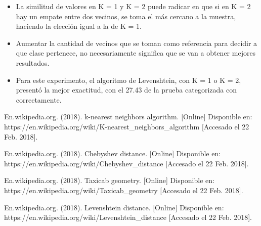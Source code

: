 \documentclass[conference]{IEEEtran}
\begin{document}
\begin{itemize}
\item La similitud de valores en K = 1 y K = 2 puede radicar en que si en K = 2 hay un empate entre dos vecinos, se toma el más cercano a la muestra, haciendo la elección igual a la de K = 1.
\item Aumentar la cantidad de vecinos que se toman como referencia para decidir a que clase pertenece, no necesariamente significa que se van a obtener mejores resultados.
\item Para este experimento, el algoritmo de Levenshtein, con K = 1 o K = 2, presentó la mejor exactitud, con el 27.43 de la prueba categorizada con correctamente.
\end{itemize}

\begin{thebibliography}{1}


En.wikipedia.org. (2018). k-nearest neighbors algorithm. [Online] Disponible en: https://en.wikipedia.org/wiki/K-nearest\_neighbors\_algorithm [Accesado el 22 Feb. 2018].

En.wikipedia.org. (2018). Chebyshev distance. [Online] Disponible en: https://en.wikipedia.org/wiki/Chebyshev\_distance [Accesado el 22 Feb. 2018].

En.wikipedia.org. (2018). Taxicab geometry. [Online] Disponible en: https://en.wikipedia.org/wiki/Taxicab\_geometry [Accesado el 22 Feb. 2018].

En.wikipedia.org. (2018). Levenshtein distance. [Online] Disponible en: https://en.wikipedia.org/wiki/Levenshtein\_distance [Accesado el 22 Feb. 2018].

\end{thebibliography}
\end{document}
